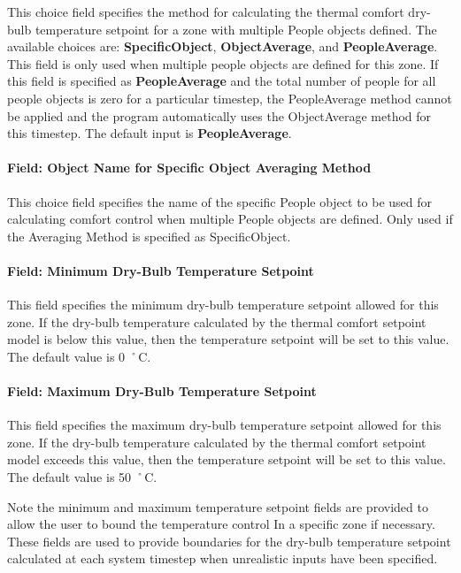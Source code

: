 This choice field specifies the method for calculating the thermal comfort dry-bulb temperature setpoint for a zone with multiple People objects defined. The available choices are: \textbf{SpecificObject}, \textbf{ObjectAverage}, and \textbf{PeopleAverage}. This field is only used when multiple people objects are defined for this zone. If this field is specified as \textbf{PeopleAverage} and the total number of people for all people objects is zero for a particular timestep, the PeopleAverage method cannot be applied and the program automatically uses the ObjectAverage method for this timestep. The default input is \textbf{PeopleAverage}.

\paragraph{Field: Object Name for Specific Object Averaging Method}\label{field-object-name-for-specific-object-averaging-method}

This choice field specifies the name of the specific People object to be used for calculating comfort control when multiple People objects are defined. Only used if the Averaging Method is specified as SpecificObject.

\paragraph{Field: Minimum Dry-Bulb Temperature Setpoint}\label{field-minimum-dry-bulb-temperature-setpoint}

This field specifies the minimum dry-bulb temperature setpoint allowed for this zone. If the dry-bulb temperature calculated by the thermal comfort setpoint model is below this value, then the temperature setpoint will be set to this value. The default value is 0 ˚C.

\paragraph{Field: Maximum Dry-Bulb Temperature Setpoint}\label{field-maximum-dry-bulb-temperature-setpoint}

This field specifies the maximum dry-bulb temperature setpoint allowed for this zone. If the dry-bulb temperature calculated by the thermal comfort setpoint model exceeds this value, then the temperature setpoint will be set to this value. The default value is 50 ˚C.

Note the minimum and maximum temperature setpoint fields are provided to allow the user to bound the temperature control In a specific zone if necessary. These fields are used to provide boundaries for the dry-bulb temperature setpoint calculated at each system timestep when unrealistic inputs have been specified.

